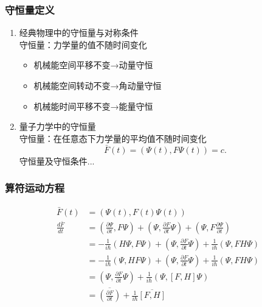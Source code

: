 \begin{frame} 
    \frametitle{守恒量定义}
    \begin{enumerate}
        \item  经典物理中的守恒量与对称条件\\
                守恒量：力学量的值不随时间变化\\
                \begin{itemize}
                    \item 机械能空间平移不变→动量守恒
                    \item 机械能空间转动不变→角动量守恒
                    \item 机械能时间平移不变→能量守恒
                \end{itemize}
        \item  量子力学中的守恒量\\
                守恒量：在任意态下力学量的平均值不随时间变化\\
                $$ \bar{F}(t)=(\Psi(t), F\Psi(t)) =c.  $$
                守恒量及守恒条件... 
    \end{enumerate}
\end{frame} 

\begin{frame} [allowframebreaks=]
    \frametitle{算符运动方程}    
        \begin{equation*}
            \begin{split} 
            \bar{F}(t)&=(\Psi(t), F(t)\Psi(t)) \\
            \frac{d\bar{F}}{dt}&=(\frac{\partial\Psi }{\partial t}, F\Psi) +(\Psi, \frac{\partial F }{\partial t}\Psi) +(\Psi, F\frac{\partial\Psi }{\partial t}) \\
            &= - \frac{1}{i\hbar} (H\Psi, F\Psi)+(\Psi, \frac{\partial F }{\partial t}\Psi) + \frac{1}{i\hbar} (\Psi, FH\Psi) \\
            &= - \frac{1}{i\hbar} (\Psi, HF\Psi)+(\Psi, \frac{\partial F }{\partial t}\Psi) + \frac{1}{i\hbar} (\Psi, FH\Psi) \\
            &= (\Psi, \frac{\partial F }{\partial t}\Psi)  +\frac{1}{i\hbar} (\Psi, [F,H]\Psi) \\
            &=\overline{(\frac{\partial F }{\partial t})}  +\frac{1}{i\hbar} \overline{[F,H]} \\
            \end{split}  
        \end{equation*}  
\end{frame} 

